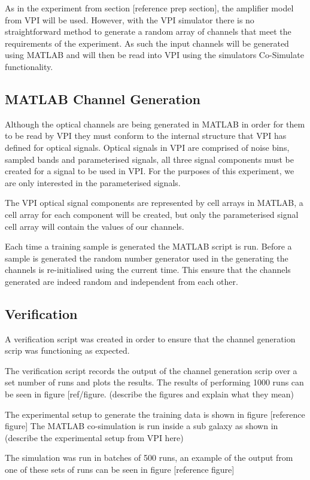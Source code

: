 As in the experiment from section [reference prep section], the amplifier model from VPI will be used. However, with the VPI simulator there is no straightforward method to generate a random array of channels that meet the requirements of the experiment. 
As such the input channels will be generated using MATLAB and will then be read into VPI using the simulators Co-Simulate functionality. 


\subsection{MATLAB Channel Generation}

Although the optical channels are being generated in MATLAB in order for them to be read by VPI they must conform to the internal structure that VPI has defined for optical signals. 
Optical signals in VPI are comprised of noise bins, sampled bands and parameterised signals, all three signal components must be created for a signal to be used in VPI. 
For the purposes of this experiment, we are only interested in the parameterised signals.

The VPI optical signal components are represented by cell arrays in MATLAB, a cell array for each component will be created, but only the parameterised signal cell array will contain the values of our channels.  

Each time a training sample is generated the MATLAB script is run. Before a sample is generated the random number generator used in the generating the channels is re-initialised using the current time. This ensure that the channels generated are indeed random and independent from each other. 


\subsection{Verification}	
A verification script was created in order to ensure that the channel generation scrip was functioning as expected.

The verification script records the output of the channel generation scrip over a set number of runs and plots the results. The results of performing 1000 runs can be seen in figure [ref/figure. (describe the figures and explain what they mean)



The experimental setup to generate the training data is shown in figure [reference figure]
The MATLAB co-simulation is run inside a sub galaxy as shown in 
(describe the experimental setup from VPI here)

The simulation was run in batches of 500 runs, an example of the output from one of these sets of runs can be seen in figure [reference figure]


